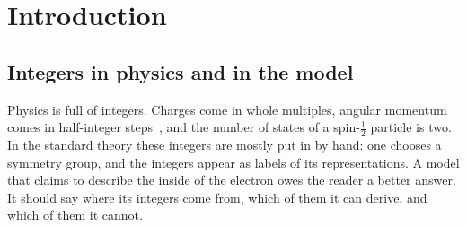 \documentclass[%
 reprint, amsmath,amssymb, aps, prb, ]{revtex4-2}
\numberwithin{equation}{section}
\begin{document}
\begin{abstract}
We then define the internal time as the transport cycle between the kernels, fixed by the anomalous magnetic moment through $\beta=0.04047$, show that it runs exactly $\beta$ times slower than the Dirac branch phase, and show that the kernel separation is the transport speed times one tick, $\lambda_C=\beta c\,T_{\mathrm{tr}}$.
Metric structure is not needed while the two kernels merely sit; it enters with transport, together with the constitutive relation and the fine-structure constant.
We state explicitly that the model derives the integer of charge, its existence, quantization, conservation and sign, but not its size: the fine-structure constant is not derived here, nor is the coupling to the electromagnetic potential or the light-cone structure.
The decisive test is experimental: the internal transport speed $\beta c\approx0.04\,c$, fixed with no free parameter, is unmeasured and would confirm or exclude the internal clock.
\end{abstract}

\maketitle

\onecolumngrid
\tableofcontents
\clearpage
\twocolumngrid

\section{Introduction}
\label{sec:intro}

\subsection{Integers in physics and in the model}

Physics is full of integers. Charges come in whole multiples, angular momentum comes in half-integer steps~\cite{ref:uhlenbeck,ref:sakurai}, and the number of states of a spin-$\tfrac12$ particle is two. In the standard theory these integers are mostly put in by hand: one chooses a symmetry group, and the integers appear as labels of its representations. A model that claims to describe the inside of the electron owes the reader a better answer. It should say where its integers come from, which of them it can derive, and which of them it cannot.
\end{document}
